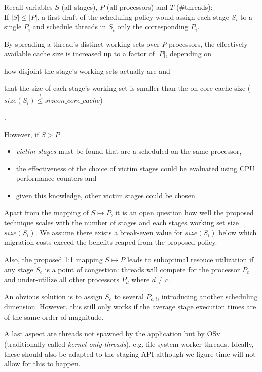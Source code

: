 \documentclass{article}
\begin{document}
Recall variables \textbf{$S$} (all stages), \textbf{$P$} (all processors) and \textbf{$T$} (\#threads):\\
If $|S| \le |P|$, a first draft of the scheduling policy would
assign each stage $S_i$ to a single $P_i$ and schedule threads in $S_i$ only the corresponding $P_i$.

By spreading a thread's distinct working sets over $P$ processors,
the effectively available cache size is increased up to a factor of $|P|$, depending on
\begin{enumerate*}
    \item how disjoint the stage's working sets actually are and
    \item that the size of each stage's working set is smaller than the on-core cache size ($size(S_i) \overset{!}{\le} size{on\_core\_cache}$)
\end{enumerate*}.

However, if $S > P$
\begin{itemize}
    \item \textit{victim stages} must be found that are a scheduled on the same processor,
    \item the effectiveness of the choice of victim stages could be evaluated using CPU performance counters and
    \item given this knowledge, other victim stages could be chosen.  
\end{itemize}

Apart from the mapping of $S \mapsto P$, it is an open question how well the proposed technique scales with the number of stages and each stages working set size $size(S_i)$.
We assume there exists a break-even value for $size(S_i)$ below which migration costs exceed the benefits reaped from the proposed policy.

Also, the proposed 1:1 mapping $S \mapsto P$ leads to suboptimal resouce utilization if any stage $S_c$ is a point of congestion:
threads will compete for the processor $P_c$ and under-utilize all other processors $P_d$ where $d \ne c$.

An obvious solution is to assign $S_c$ to several $P_{c,i}$, introducing another scheduling dimension.
However, this still only works if the average stage execution times are of the same order of magnitude.

A last aspect are threads not spawned by the application but by OSv (traditionally called \emph{kernel-only threads}),
e.g. file system worker threads.
Ideally, these should also be adapted to the staging API although we figure time will not allow for this to happen.
\end{document}
